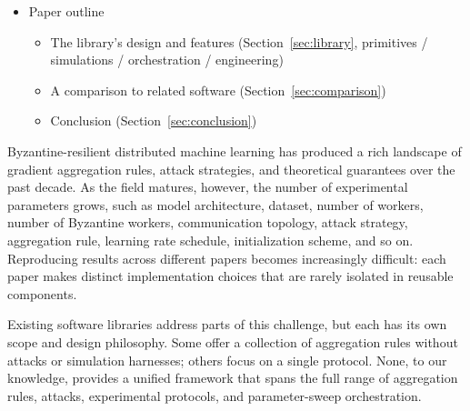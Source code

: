 \documentclass[twoside,11pt]{article}
\begin{document}
{\begin{itemize}
\begin{itemize}
\begin{itemize}
        \end{itemize}
        \item Limitations: fewer aggregators than FL-Byz-Lib (36) and ByzFL (12 + 4 pre), no pre-aggregators, sequential synchronous execution
    \end{itemize}
    \item Paper outline
    \begin{itemize}
        \item The library's design and features (Section~\ref{sec:library}, primitives / simulations / orchestration / engineering)
        \item A comparison to related software (Section~\ref{sec:comparison})
        \item Conclusion (Section~\ref{sec:conclusion})
    \end{itemize}
\end{itemize}
}



Byzantine-resilient distributed machine learning has produced a rich
landscape of gradient aggregation rules, attack strategies, and
theoretical guarantees over the past decade.  As the field matures,
however, the number of experimental parameters
grows, such as model architecture, dataset, number of workers, number of
Byzantine workers, communication topology, attack strategy, aggregation
rule, learning rate schedule, initialization scheme, and so on.
Reproducing results across different papers becomes increasingly
difficult: each paper makes distinct implementation choices that are
rarely isolated in reusable components.

Existing software libraries address parts of this challenge, but each has
its own scope and design philosophy.  Some offer a collection of
aggregation rules without attacks or simulation harnesses; others focus
on a single protocol.  None, to our knowledge, provides a unified
framework that spans the full range of aggregation rules, attacks,
experimental protocols, and parameter-sweep orchestration.
\end{document}
